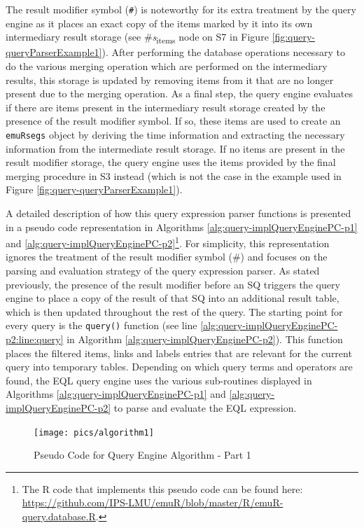 \documentclass[]{book}
\let\rmarkdownfootnote\footnote%
\def\footnote{\protect\rmarkdownfootnote}
\begin{document}
The result modifier symbol (\texttt{\#}) is noteworthy for its extra treatment by the query engine as it places an exact copy of the items marked by it into its own intermediary result storage (see \#\emph{s}\textsubscript{items} node on S7 in Figure \ref{fig:query-queryParserExample1}). After performing the database operations necessary to do the various merging operation which are performed on the intermediary results, this storage is updated by removing items from it that are no longer present due to the merging operation. As a final step, the query engine evaluates if there are items present in the intermediary result storage created by the presence of the result modifier symbol. If so, these items are used to create an \texttt{emuRsegs} object by deriving the time information and extracting the necessary information from the intermediate result storage. If no items are present in the result modifier storage, the query engine uses the items provided by the final merging procedure in S3 instead (which is not the case in the example used in Figure \ref{fig:query-queryParserExample1}).

A detailed description of how this query expression parser functions is presented in a pseudo code representation in Algorithms \ref{alg:query-implQueryEnginePC-p1} and \ref{alg:query-implQueryEnginePC-p2}\footnote{The R code that implements this pseudo code can be found here: \url{https://github.com/IPS-LMU/emuR/blob/master/R/emuR-query.database.R}.}. For simplicity, this representation ignores the treatment of the result modifier symbol (\#) and focuses on the parsing and evaluation strategy of the query expression parser. As stated previously, the presence of the result modifier before an SQ triggers the query engine to place a copy of the result of that SQ into an additional result table, which is then updated throughout the rest of the query. The starting point for every query is the \texttt{query()} function (see line \ref{alg:query-implQueryEnginePC-p2:line:query} in Algorithm \ref{alg:query-implQueryEnginePC-p2}). This function places the filtered items, links and labels entries that are relevant for the current query into temporary tables. Depending on which query terms and operators are found, the EQL query engine uses the various sub-routines displayed in Algorithms \ref{alg:query-implQueryEnginePC-p1} and \ref{alg:query-implQueryEnginePC-p2} to parse and evaluate the EQL expression.

\begin{figure}

{\centering \texttt{[image: pics/algorithm1]} 

}

\caption{Pseudo Code for Query Engine Algorithm - Part 1}\label{fig:query-implQueryEnginePC-p1}
\end{figure}
\end{document}
